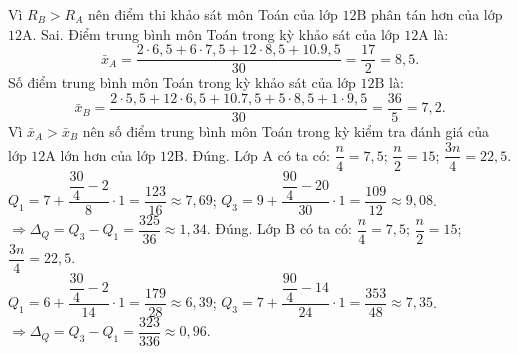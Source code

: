 \begin{ex}
{\begin{itemchoice}
			Vì $R_B>R_A$ nên điểm thi khảo sát môn Toán của lớp $12\mathrm{B}$ phân tán hơn của lớp $12\mathrm{A}$.
			\itemch Sai. Điểm trung bình môn Toán trong kỳ khảo sát của lớp $12\mathrm{A}$ là:
			$$
			\bar{x}_A=\dfrac{2 \cdot 6{,}5+6 \cdot 7{,}5+12 \cdot 8{,}5+10.9{,}5}{30}=\dfrac{17}{2}=8{,}5.
			$$
			Số điểm trung bình môn Toán trong kỳ khảo sát của lớp $12\mathrm{B}$ là:
			$$
			\bar{x}_B=\dfrac{2 \cdot 5{,}5+12 \cdot 6{,}5+10.7{,}5+5 \cdot 8{,}5+1 \cdot 9{,}5}{30}=\dfrac{36}{5}=7{,}2.
			$$
			Vì $\bar{x}_A>\bar{x}_B$ nên số điểm trung bình môn Toán trong kỳ kiểm tra đánh giá của lớp $12\mathrm{A}$ lớn hơn của lớp $12\mathrm{B}$.
			\itemch Đúng. Lớp $\mathrm{A}$ có ta có: 
			$\dfrac{n}{4}=7{,}5$; $\dfrac{n}{2}=15$; $\dfrac{3n}{4}=22{,}5$.\\
			$Q_1=7+\dfrac{\dfrac{30}{4}-2}{8} \cdot 1=\dfrac{123}{16} \approx 7{,}69$; $Q_3=9+\dfrac{\dfrac{90}{4}-20}{30} \cdot 1=\dfrac{109}{12} \approx 9{,}08$.\\
			$\Rightarrow \Delta_Q=Q_3-Q_1=\dfrac{325}{36} \approx 1{,}34$.
			\itemch Đúng. Lớp $\mathrm{B}$ có ta có: $\dfrac{n}{4}=7{,}5$; $\dfrac{n}{2}=15$; $\dfrac{3 n}{4}=22{,}5$.\\
			$Q_1=6+\dfrac{\dfrac{30}{4}-2}{14} \cdot 1=\dfrac{179}{28} \approx 6{,}39$; $Q_3=7+\dfrac{\dfrac{90}{4}-14}{24} \cdot 1=\dfrac{353}{48} \approx 7{,}35$.\\ 
			$\Rightarrow \Delta_Q=Q_3-Q_1=\dfrac{323}{336} \approx 0{,}96$.
		\end{itemchoice}
	}
\end{ex}

